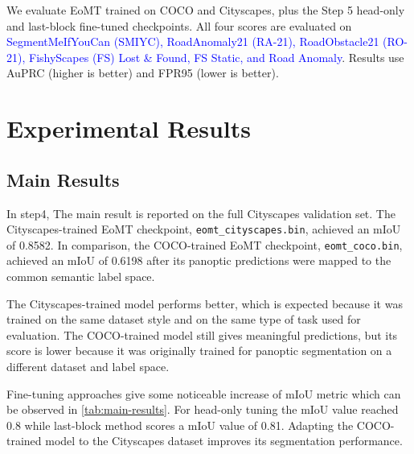 \documentclass[10pt,twocolumn,letterpaper]{article}
\begin{document}
We evaluate EoMT trained on COCO and Cityscapes, plus the Step 5 head-only and
last-block fine-tuned checkpoints. All four scores are evaluated on \textcolor{blue}{\mbox{SegmentMeIfYouCan} (SMIYC), RoadAnomaly21 (RA-21), RoadObstacle21 (RO-21), FishyScapes (FS) Lost \& Found, FS Static, and Road Anomaly}.
Results use AuPRC (higher is better) and FPR95 (lower is better).

\section{Experimental Results}

\subsection{Main Results}

In step4, The main result is reported on the full Cityscapes validation set. The Cityscapes-trained EoMT checkpoint, \texttt{eomt\_cityscapes.bin}, achieved an mIoU of 0.8582. In comparison, the COCO-trained EoMT checkpoint, \texttt{eomt\_coco.bin}, achieved an mIoU of 0.6198 after its panoptic predictions were mapped to the common semantic label space.

The Cityscapes-trained model performs better, which is expected because it was trained on the same dataset style and on the same type of task used for evaluation. The COCO-trained model still gives meaningful predictions, but its score is lower because it was originally trained for panoptic segmentation on a different dataset and label space.

Fine-tuning approaches give some noticeable increase of mIoU metric which can be observed in \cref{tab:main-results}. For head-only tuning the mIoU value reached 0.8 while last-block method scores a mIoU value of 0.81. Adapting the COCO-trained model to the Cityscapes dataset improves its segmentation performance.
\begin{table}[t]
\centering
\caption{Post-hoc pixel-based baselines on ERFNet. Cells: AuPRC$\uparrow$ /
  FPR95$\downarrow$ (\%).}
\label{tab:pixel-based baselines}
\setlength{\tabcolsep}{3pt}
\scriptsize
{}
\end{table}
\end{document}
